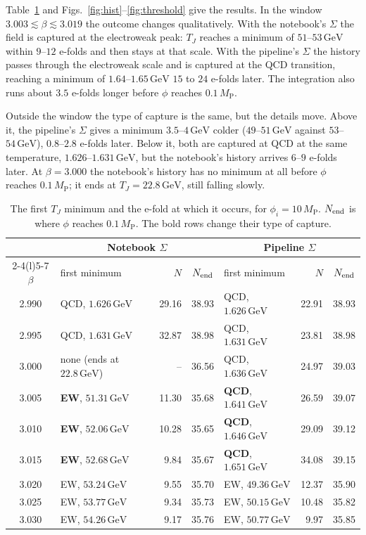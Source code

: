 \documentclass[11pt,a4paper]{article}
\newcommand{\MP}{M_{\mathrm{P}}}
\newcommand{\TJ}{T_{J}}
\newcommand{\GeV}{\,\mathrm{GeV}}
\begin{document}
Table~\ref{tab:scan} and Figs.~\ref{fig:hist}--\ref{fig:threshold} give the results. In the
window $3.003 \lesssim \beta \lesssim 3.019$ the outcome changes qualitatively. With the
notebook's $\Sigma$ the field is captured at the electroweak peak: $\TJ$ reaches a minimum
of $51$--$53\GeV$ within $9$--$12$ e-folds and then stays at that scale. With the pipeline's
$\Sigma$ the history passes through the electroweak scale and is captured at the QCD
transition, reaching a minimum of $1.64$--$1.65\GeV$ $15$ to $24$ e-folds later. The integration
also runs about $3.5$ e-folds longer before $\phi$ reaches $0.1\,\MP$.

Outside the window the type of capture is the same, but the details move. Above it, the
pipeline's $\Sigma$ gives a minimum $3.5$--$4\GeV$ colder ($49$--$51\GeV$ against
$53$--$54\GeV$), $0.8$--$2.8$ e-folds later. Below it, both are captured at QCD at the same
temperature, $1.626$--$1.631\GeV$, but the notebook's history arrives $6$--$9$ e-folds later.
At $\beta = 3.000$ the notebook's history has no minimum at all before $\phi$ reaches
$0.1\,\MP$; it ends at $\TJ = 22.8\GeV$, still falling slowly.

\begin{table}[ht]
\centering\small
\begin{tabular}{@{}c@{\hspace{1.2em}}lrr@{\hspace{1.5em}}lrr@{}}
\toprule
 & \multicolumn{3}{c}{Notebook $\Sigma$} & \multicolumn{3}{c}{Pipeline $\Sigma$} \\
\cmidrule(lr){2-4}\cmidrule(l){5-7}
$\beta$ & first minimum & $N$ & $N_{\rm end}$ & first minimum & $N$ & $N_{\rm end}$ \\
\midrule
2.990 & QCD, $1.626\GeV$ & 29.16 & 38.93 & QCD, $1.626\GeV$ & 22.91 & 38.93 \\
2.995 & QCD, $1.631\GeV$ & 32.87 & 38.98 & QCD, $1.631\GeV$ & 23.81 & 38.98 \\
3.000 & none (ends at $22.8\GeV$) & -- & 36.56 & QCD, $1.636\GeV$ & 24.97 & 39.03 \\
3.005 & \textbf{EW}, $51.31\GeV$ & 11.30 & 35.68 & \textbf{QCD}, $1.641\GeV$ & 26.59 & 39.07 \\
3.010 & \textbf{EW}, $52.06\GeV$ & 10.28 & 35.65 & \textbf{QCD}, $1.646\GeV$ & 29.09 & 39.12 \\
3.015 & \textbf{EW}, $52.68\GeV$ & 9.84 & 35.67 & \textbf{QCD}, $1.651\GeV$ & 34.08 & 39.15 \\
3.020 & EW, $53.24\GeV$ & 9.55 & 35.70 & EW, $49.36\GeV$ & 12.37 & 35.90 \\
3.025 & EW, $53.77\GeV$ & 9.34 & 35.73 & EW, $50.15\GeV$ & 10.48 & 35.82 \\
3.030 & EW, $54.26\GeV$ & 9.17 & 35.76 & EW, $50.77\GeV$ & 9.97 & 35.85 \\
\bottomrule
\end{tabular}
\caption{The first $\TJ$ minimum and the e-fold at which it occurs, for $\phi_i = 10\,\MP$.
$N_{\rm end}$ is where $\phi$ reaches $0.1\,\MP$. The bold rows change their type of capture.}
\label{tab:scan}
\end{table}
\end{document}
